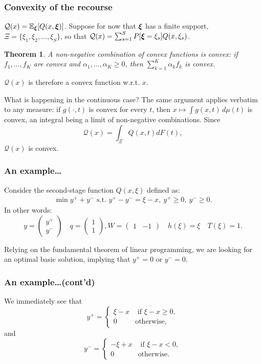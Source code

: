 \documentclass[aspectratio=169]{beamer}
\newtheorem{theo}{Theorem}
\begin{document}
\begin{frame}
\frametitle{Convexity of the recourse}

$\mathcal{Q}(x) = {\mathbb{E}}_{{\boldsymbol{\xi}}} [Q(x,{\boldsymbol{\xi}})]$. Suppose for now that ${\boldsymbol{\xi}}$ has a finite support,
$\Xi = \lbrace \xi_1, \xi_2,\ldots, \xi_S \rbrace$, so that
$\mathcal{Q}(x) = \sum_{s = 1}^{S} P[{\boldsymbol{\xi}} = \xi_s] Q(x,\xi_s)$.

\begin{theo}
A non-negative combination of convex functions is convex: if $f_1,\ldots,f_K$ are convex and $\alpha_1,\ldots,\alpha_K \geq 0$, then $\sum_{k=1}^K \alpha_k f_k$ is convex.
\end{theo}

$\mathcal{Q}(x)$ is therefore a convex function w.r.t. $x$.

\mbox{}

What is happening in the continuous case?
The same argument applies verbatim to any measure: if $g(\cdot, t)$ is convex for every $t$, then $x \mapsto \int g(x,t)\,d\mu(t)$ is convex, an integral being a limit of non-negative combinations. Since
\[
\mathcal{Q}(x) = \int_{\Xi} Q(x,t) dF(t),
\]
{\red $\mathcal{Q}(x)$ is convex}.

\end{frame}

\begin{frame}
\frametitle{An example\ldots}

Consider the second-stage function $Q(x,\xi)$ defined as:
\begin{align*}
\min y^++y^- \mbox{ s.t. } y^+-y^- = \xi - x,\ y^+ \geq 0,\ y^- \geq 0.
\end{align*}
In other words:
\[
y = \begin{pmatrix} y^+ \\ y^- \end{pmatrix} \quad q = \begin{pmatrix}
    1 \\ 1 \end{pmatrix}, W = \begin{pmatrix} 1 & -1 \end{pmatrix}
  \quad h(\xi) = \xi \quad T(\xi) = 1.
\]

\mbox{}

Relying on the fundamental theorem of linear programming, we are looking for an optimal basic solution, implying that $y^+ = 0$ or $y^- = 0$.

\end{frame}

\begin{frame}
\frametitle{An example\ldots (cont'd)}

We immediately see that
$$
y^+ = \begin{cases}
	\xi - x & \text{ if } \xi - x \geq 0, \\
	0 & \text{otherwise,}
\end{cases}
$$
and
$$
y^- = \begin{cases}
	-\xi + x & \text{ if } \xi - x < 0, \\
	0 & \text{otherwise.}
\end{cases}
$$

\end{frame}
\end{document}
